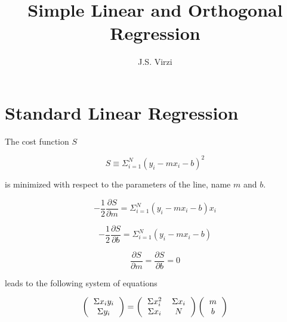 \documentclass{article}
\title{Simple Linear and Orthogonal Regression}
\author{J.S. Virzi}
\begin{document}
\maketitle

\section{Standard Linear Regression}

The cost function $S$

\begin{equation}
S \equiv \Sigma_{i=1}^{N} \left( y_{i} - m x_{i} - b \right)^{2}
\end{equation}

is minimized with respect to the parameters of the line, name $m$ and $b$.

\begin{equation}
-\frac{1}{2}\frac{\partial S}{\partial m} = \Sigma_{i=1}^{N} \left( y_{i} - m x_{i} - b \right) x_{i}
\end{equation}

\begin{equation}
-\frac{1}{2}\frac{\partial S}{\partial b} = \Sigma_{i=1}^{N} \left( y_{i} - m x_{i} - b \right)
\end{equation}

\begin{equation}
\frac{\partial S}{\partial m} = \frac{\partial S}{\partial b} = 0
\end{equation}


leads to the following system of equations

\begin{equation}
\left(
\begin{tabular}{c}
$\Sigma x_{i} y_{i}$ \\
$\Sigma y_{i}$
\end{tabular}
\right) = 
\left(
\begin{tabular}{cc}
$ \Sigma x_{i}^{2} $ & $\Sigma x_{i} $ \\
$ \Sigma x_{i} $ & $N$ \\
\end{tabular}
\right)
\left(
\begin{tabular}{c}
$m$ \\
$b$
\end{tabular}
\right)
\end{equation}
\end{document}
